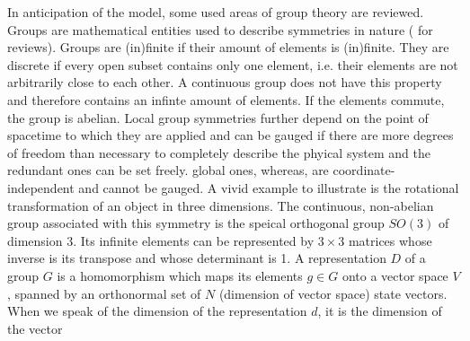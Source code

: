 In anticipation of the model, some used areas of group theory are reviewed. Groups are mathematical entities used to describe symmetries in nature
(\cite{pierre}\cite{georgi} for reviews). Groups are (in)finite if their amount of elements is (in)finite. They are discrete if every open subset
contains only one element, i.e. their elements are not arbitrarily close to each other. A continuous group does not have this property and therefore
contains an infinte amount of elements. If the elements commute, the group is abelian. 
Local group symmetries further depend on the point of spacetime to which they are applied and can be gauged if there are more degrees of freedom
than necessary to completely describe the phyical system and the redundant ones can be set freely. global ones,
whereas, are coordinate-independent and cannot be gauged. 
A vivid example to illustrate is the rotational transformation
of an object in three dimensions. The continuous, non-abelian group associated with this symmetry is the speical orthogonal group 
$SO(3)$ of dimension 3. Its infinite elements can be represented by $3\times3$ matrices whose inverse is its 
transpose and whose determinant is 1.
% 
% 
% 
\noindent A representation $D$ of a group $G$ is a homomorphism which maps its elements $g\in G$ onto a vector space $V$, spanned by an orthonormal
set of $N$ (dimension of vector space) state vectors. When we speak of the dimension of the representation $d$, it is the dimension of the vector 
